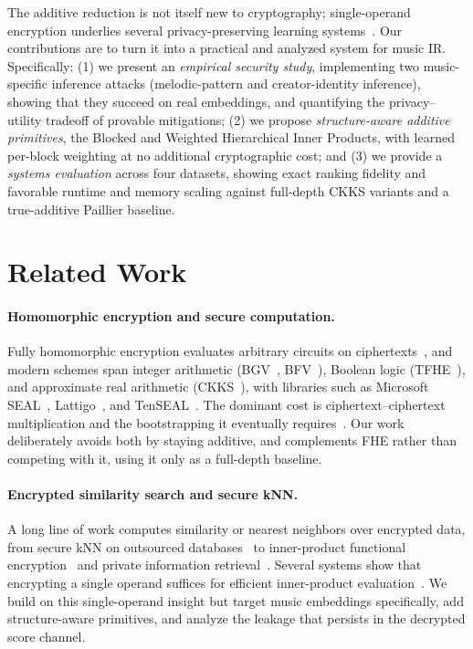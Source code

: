 \documentclass[sigconf,nonacm]{acmart}
\begin{document}
The additive reduction is not itself new to cryptography; single-operand encryption underlies several privacy-preserving learning systems~\cite{prism_sigmod21,otawose_sigmod23,zhao2025note,ipfe2015}. Our contributions are to turn it into a practical and analyzed system for music IR. Specifically: (1) we present an \emph{empirical security study}, implementing two music-specific inference attacks (melodic-pattern and creator-identity inference), showing that they succeed on real embeddings, and quantifying the privacy--utility tradeoff of provable mitigations; (2) we propose \emph{structure-aware additive primitives}, the Blocked and Weighted Hierarchical Inner Products, with learned per-block weighting at no additional cryptographic cost; and (3) we provide a \emph{systems evaluation} across four datasets, showing exact ranking fidelity and favorable runtime and memory scaling against full-depth CKKS variants and a true-additive Paillier baseline.

\section{Related Work}
\label{sec:related}
\paragraph{Homomorphic encryption and secure computation.}
Fully homomorphic encryption evaluates arbitrary circuits on ciphertexts~\cite{cgentry_stoc09}, and modern schemes span integer arithmetic (BGV~\cite{bgv2012}, BFV~\cite{bfv2012}), Boolean logic (TFHE~\cite{tfhe2020}), and approximate real arithmetic (CKKS~\cite{cheon2017homomorphic}), with libraries such as Microsoft SEAL~\cite{sealcrypto}, Lattigo~\cite{lattigo}, and TenSEAL~\cite{benaissa2021tenseal}. The dominant cost is ciphertext--ciphertext multiplication and the bootstrapping it eventually requires~\cite{ckksboot2018}. Our work deliberately avoids both by staying additive, and complements FHE rather than competing with it, using it only as a full-depth baseline.

\paragraph{Encrypted similarity search and secure kNN.}
A long line of work computes similarity or nearest neighbors over encrypted data, from secure kNN on outsourced databases~\cite{secureknn2009,elmehdwi2014} to inner-product functional encryption~\cite{ipfe2015} and private information retrieval~\cite{pir1995}. Several systems show that encrypting a single operand suffices for efficient inner-product evaluation~\cite{prism_sigmod21,otawose_sigmod23,zhao2025note}. We build on this single-operand insight but target music embeddings specifically, add structure-aware primitives, and analyze the leakage that persists in the decrypted score channel.
\end{document}
